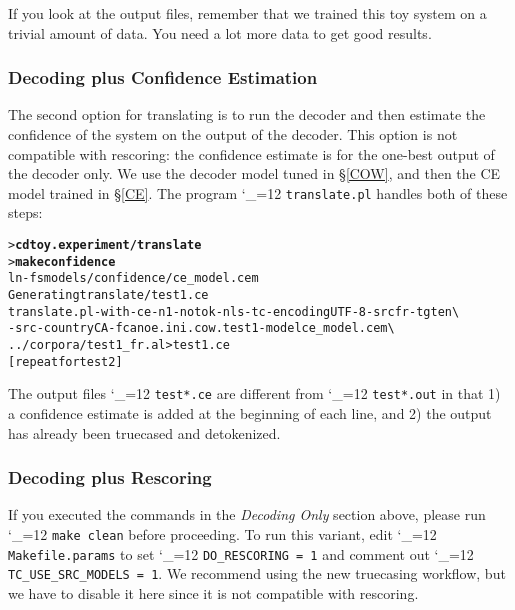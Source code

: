 \documentclass[11pt,letterpaper]{article}
\newcommand{\bs}{\textbackslash{}}
\def\code{\begingroup\catcode`\_=12 \codex}
\newcommand{\codex}[1]{\texttt{#1}\endgroup}
\begin{document}
If you look at the output files, remember that we trained this toy system on a
trivial amount of data.  You
need a lot more data to get good results.

\subsubsection{Decoding plus Confidence Estimation} \label{CETrans}

The second option for translating is to run the decoder and then estimate the
confidence of the system on the output of the decoder.  This option is not
compatible with rescoring: the confidence estimate is for the one-best output
of the decoder only.  We use the decoder model tuned in \S\ref{COW}, and
then the CE model trained in \S\ref{CE}.  The program
\code{translate.pl} handles both of these steps:
\begin{small}
\begin{alltt}
   > \textbf{cd toy.experiment/translate}
   > \textbf{make confidence}
   ln -fs models/confidence/ce_model.cem
   Generating translate/test1.ce
   translate.pl -with-ce -n 1 -notok -nl s -tc -encoding UTF-8 -src fr -tgt en \bs
      -src-country CA -f canoe.ini.cow.test1 -model ce_model.cem \bs
      ../corpora/test1_fr.al > test1.ce
   [repeat for test2]
\end{alltt}
\end{small}
The output files \code{test*.ce} are different from \code{test*.out}
in that 1) a confidence estimate is added
at the beginning of each line, and 2) the output has already been
truecased and detokenized.

\subsubsection{Decoding plus Rescoring} \label{RATTrans}

If you executed the commands in the \emph{Decoding Only} section above, please
run \code{make clean} before proceeding.  To run this variant, edit
\code{Makefile.params} to set \code{DO_RESCORING = 1}
and comment out \code{TC_USE_SRC_MODELS = 1}.  We recommend using the new
truecasing workflow, but we have to disable it here since it is not
compatible with rescoring.
\end{document}
